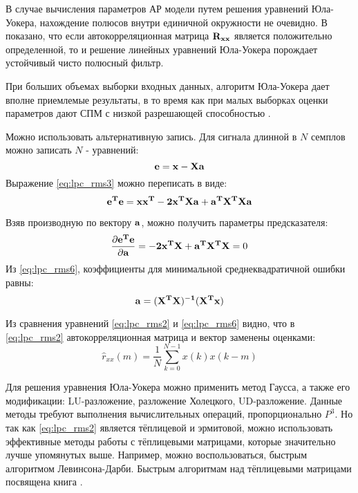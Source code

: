 В случае вычисления параметров АР модели путем решения уравнений Юла-Уокера, нахождение полюсов
внутри единичной окружности не очевидно. В \cite{shahtarin-spectrum-book} показано, что если
автокорреляционная матрица  ${{\bf R_{xx}}}$ является положительно определенной, то и решение
линейных уравнений Юла-Уокера порождает устойчивый чисто полюсный фильтр.

При больших объемах выборки входных данных, алгоритм Юла-Уокера дает вполне приемлемые результаты, в то время
как при малых выборках оценки параметров дают СПМ с низкой разрешающей способностью \cite{marpl_book, bolshakov-book}.

Можно использовать альтернативную запись.  Для сигнала длинной в ${N}$ семплов можно записать ${N}$ - уравнений:
\begin{equation}
	\label{eq:lpc_rms3}
	{\bf e=x-Xa}
\end{equation}
Выражение \ref{eq:lpc_rms3} можно переписать в виде:
\begin{equation}
	\label{eq:lpc_rms4}
	{\bf e^T e = xx^T - 2x^T Xa + a^T X^T Xa}
\end{equation}

Взяв производную по вектору ${{\bf a}}$, можно получить параметры предсказателя:
\begin{equation}
	\label{eq:lpc_rms5}
	\frac{\partial {\bf e^T e}}{\partial {\bf a}} = {\bf - 2x^T X + a^T X^T X} = 0
\end{equation}
Из \ref{eq:lpc_rms6}, коэффициенты для минимальной среднеквадратичной ошибки равны:
\begin{equation}
	\label{eq:lpc_rms6}
	{\bf a= (X^T X)^{-1} (X^T x)}
\end{equation}

Из сравнения уравнений \ref{eq:lpc_rms2} и \ref{eq:lpc_rms6} видно, что в \ref{eq:lpc_rms2}
автокорреляционная матрица и вектор заменены оценками:
\begin{equation}
	\label{eq:lpc_rxx_estimation}
	\hat{r}_{xx}(m) = \frac{1}{N} \sum \limits_{k=0}^{N-1} x(k)x(k-m)
\end{equation}

Для решения уравнения Юла-Уокера можно применить метод Гаусса, а также его модификации: LU-разложение,
разложение Холецкого, UD-разложение. Данные методы требуют выполнения вычислительных операций, пропорционально ${P^3}$.
Но так  как \ref{eq:lpc_rms2} является тёплицевой и эрмитовой, можно использовать эффективные методы работы
с тёплицевыми матрицами, которые значительно лучше упомянутых выше. 
Например, можно воспользоваться, быстрым алгоритмом Левинсона-Дарби.
Быстрым алгоритмам над тёплицевыми матрицами посвящена книга \cite{bleyhut_book}.


